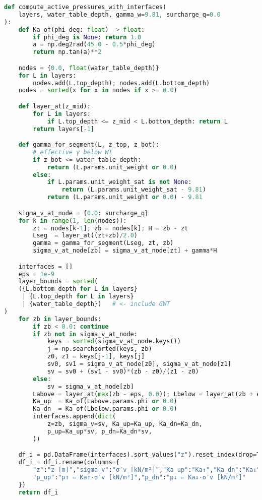 \begin{lstlisting}[language=Python]
def compute_active_pressures_with_interfaces(
    layers, water_table_depth, gamma_w=9.81, surcharge_q=0.0
):
    def Ka_of(phi_deg: float) -> float:
        if phi_deg is None: return 1.0
        a = np.deg2rad(45.0 - 0.5*phi_deg)
        return np.tan(a)**2

    nodes = {0.0, float(water_table_depth)}
    for L in layers:
        nodes.add(L.top_depth); nodes.add(L.bottom_depth)
    nodes = sorted(x for x in nodes if x >= 0.0)

    def layer_at(z_mid):
        for L in layers:
            if L.top_depth <= z_mid < L.bottom_depth: return L
        return layers[-1]

    def gamma_for_segment(L, z_top, z_bot):
        # effective γ below WT
        if z_bot <= water_table_depth:
            return (L.params.unit_weight or 0.0)
        else:
            if L.params.unit_weight_sat is not None:
                return (L.params.unit_weight_sat - 9.81)
            return (L.params.unit_weight or 0.0) - 9.81

    sigma_v_at_node = {0.0: surcharge_q}
    for k in range(1, len(nodes)):
        zt = nodes[k-1]; zb = nodes[k]; H = zb - zt
        Lseg  = layer_at((zt+zb)/2.0)
        gamma = gamma_for_segment(Lseg, zt, zb)
        sigma_v_at_node[zb] = sigma_v_at_node[zt] + gamma*H

    interfaces = []
    eps = 1e-9
    layer_bounds = sorted(
    ({L.bottom_depth for L in layers}
     | {L.top_depth for L in layers}
     | {water_table_depth})   # <- include GWT
)
    for zb in layer_bounds:
        if zb < 0.0: continue
        if zb not in sigma_v_at_node:
            keys = sorted(sigma_v_at_node.keys())
            j = np.searchsorted(keys, zb)
            z0, z1 = keys[j-1], keys[j]
            sv0, sv1 = sigma_v_at_node[z0], sigma_v_at_node[z1]
            sv = sv0 + (sv1 - sv0)*(zb - z0)/(z1 - z0)
        else:
            sv = sigma_v_at_node[zb]
        Labove = layer_at(max(zb - eps, 0.0)); Lbelow = layer_at(zb + eps)
        Ka_up  = Ka_of(Labove.params.phi or 0.0)
        Ka_dn  = Ka_of(Lbelow.params.phi or 0.0)
        interfaces.append(dict(
            z=zb, sigma_v=sv, Ka_up=Ka_up, Ka_dn=Ka_dn,
            p_up=Ka_up*sv, p_dn=Ka_dn*sv,
        ))

    df_i = pd.DataFrame(interfaces).sort_values("z").reset_index(drop=True)
    df_i = df_i.rename(columns={
        "z":"z [m]","sigma_v":"σ′v [kN/m²]","Ka_up":"Ka↑","Ka_dn":"Ka↓",
        "p_up":"p↑ = Ka↑·σ′v [kN/m²]","p_dn":"p↓ = Ka↓·σ′v [kN/m²]"
    })
    return df_i


\end{lstlisting}

